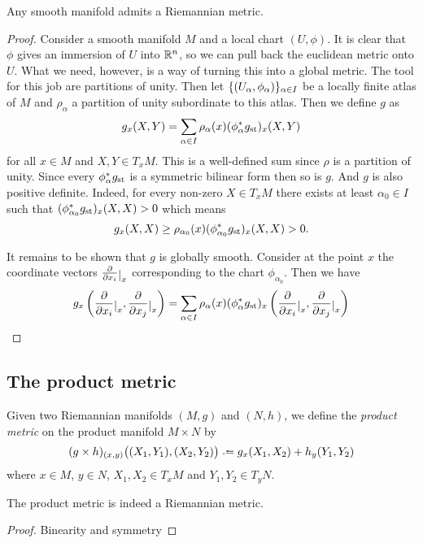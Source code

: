 \documentclass[12pt,twoside]{book}
\begin{document}
\begin{theorem}
	 Any smooth manifold admits a Riemannian metric. 
\end{theorem}
\begin{proof}
	Consider a smooth manifold \( M \) and a local chart \( (U, \phi) \). It is clear that
	\( \phi \) gives an immersion of \( U \) into \( \mathbb{R}^n \), so we can pull back the
	euclidean metric onto \( U \). What we need, however, is a way of turning this into a
	global metric. The tool for this job are partitions of unity. Then let \( \{ (U_\alpha,
	\phi_\alpha) \}_{\alpha \in I} \) be a locally finite atlas of \( M \) and \( \rho_\alpha
	\) a partition of unity subordinate to this atlas. Then we define \( g \) as
	\begin{equation*}
		g_x(X,Y) = \sum_{\alpha \in I} \rho_\alpha(x) (\phi_\alpha^{\ast}g_\text{st})_x(X,Y)
	\end{equation*}
	for all \( x \in M \) and \( X,Y \in T_xM \). This is a well-defined sum since \( \rho
	\) is a partition of unity. Since every \( \phi_\alpha^\ast g_\text{st} \) is a symmetric
	bilinear form then so is \( g \). And \( g \) is also positive definite. Indeed, for
	every non-zero \( X \in T_xM \) there exists at least \( \alpha_0 \in I \) such that \(
	(\phi^\ast_{\alpha_0} g_\text{st})_x(X,X) > 0 \) which means
	\begin{equation*}
		g_x(X,X) \geq \rho_{\alpha_0}(x) (\phi^\ast_{\alpha_0} g_\text{st})_x(X,X) > 0.
	\end{equation*}

	It remains to be shown that \( g \) is globally smooth. Consider at the point \( x \)
	the coordinate vectors \( \coord{x_i}{x} \) corresponding to the chart \(
	\phi_{\alpha_0} \). Then we have
	\begin{equation*}
		g_x\left(\coord{x_i}{x}, \coord{x_j}{x}\right) = \sum_{\alpha \in I} \rho_\alpha(x)
		(\phi_\alpha^\ast \gst)_x\left(\coord{x_i}{x}, \coord{x_j}{x}\right)
	\end{equation*}
\end{proof}

\subsection{The product metric}	
\begin{definition}
	Given two Riemannian manifolds \( (M,g) \) and \( (N,h) \), we define the \emph{product
	metric} on the product manifold \( M \times N \) by
	\begin{equation*}
		(g \times h)_{(x,y)}\big((X_1, Y_1), (X_2,Y_2)\big) \defeq g_x(X_1, X_2) + h_y(Y_1,Y_2)
	\end{equation*}
	where \( x \in M \), \( y \in N \), \( X_1,X_2 \in T_xM \) and \( Y_1,Y_2 \in T_yN \). 
\end{definition}	
\begin{proposition}
	The product metric is indeed a Riemannian metric. 
\end{proposition}	
\begin{proof}
	Binearity and symmetry
\end{proof}
\end{document}
